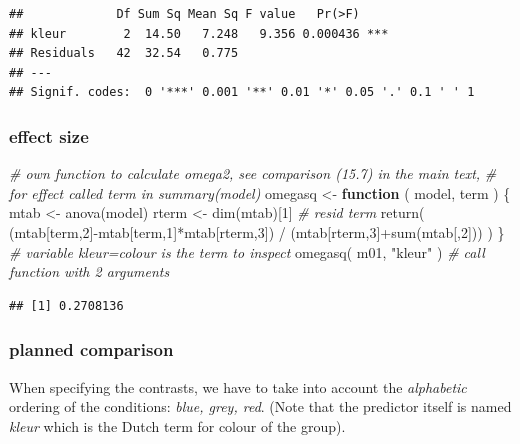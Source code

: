 \documentclass[
]{book}
\newenvironment{Shaded}{\begin{snugshade}}{\end{snugshade}}
\newcommand{\CommentTok}[1]{\textcolor[rgb]{0.56,0.35,0.01}{\textit{#1}}}
\newcommand{\ControlFlowTok}[1]{\textcolor[rgb]{0.13,0.29,0.53}{\textbf{#1}}}
\newcommand{\DecValTok}[1]{\textcolor[rgb]{0.00,0.00,0.81}{#1}}
\newcommand{\FunctionTok}[1]{\textcolor[rgb]{0.00,0.00,0.00}{#1}}
\newcommand{\NormalTok}[1]{#1}
\newcommand{\OtherTok}[1]{\textcolor[rgb]{0.56,0.35,0.01}{#1}}
\newcommand{\SpecialCharTok}[1]{\textcolor[rgb]{0.00,0.00,0.00}{#1}}
\newcommand{\StringTok}[1]{\textcolor[rgb]{0.31,0.60,0.02}{#1}}
\begin{document}
\begin{verbatim}
##             Df Sum Sq Mean Sq F value   Pr(>F)    
## kleur        2  14.50   7.248   9.356 0.000436 ***
## Residuals   42  32.54   0.775                     
## ---
## Signif. codes:  0 '***' 0.001 '**' 0.01 '*' 0.05 '.' 0.1 ' ' 1
\end{verbatim}

\hypertarget{R:omega-square}{%
\subsubsection{effect size}\label{R:omega-square}}

\begin{Shaded}
\begin{Highlighting}[]
\CommentTok{\# own function to calculate omega2, see comparison (15.7) in the main text,}
\CommentTok{\# for effect called \textasciigrave{}term\textasciigrave{} in summary(\textasciigrave{}model\textasciigrave{})}
\NormalTok{omegasq }\OtherTok{\textless{}{-}} \ControlFlowTok{function}\NormalTok{ ( model, term ) \{   }
\NormalTok{     mtab }\OtherTok{\textless{}{-}} \FunctionTok{anova}\NormalTok{(model)}
\NormalTok{     rterm }\OtherTok{\textless{}{-}} \FunctionTok{dim}\NormalTok{(mtab)[}\DecValTok{1}\NormalTok{] }\CommentTok{\# resid term}
     \FunctionTok{return}\NormalTok{( (mtab[term,}\DecValTok{2}\NormalTok{]}\SpecialCharTok{{-}}\NormalTok{mtab[term,}\DecValTok{1}\NormalTok{]}\SpecialCharTok{*}\NormalTok{mtab[rterm,}\DecValTok{3}\NormalTok{]) }\SpecialCharTok{/} 
\NormalTok{             (mtab[rterm,}\DecValTok{3}\NormalTok{]}\SpecialCharTok{+}\FunctionTok{sum}\NormalTok{(mtab[,}\DecValTok{2}\NormalTok{])) )}
\NormalTok{\}}
\CommentTok{\# variable kleur=colour is the term to inspect}
\FunctionTok{omegasq}\NormalTok{( m01, }\StringTok{"kleur"}\NormalTok{ ) }\CommentTok{\# call function with 2 arguments}
\end{Highlighting}
\end{Shaded}

\begin{verbatim}
## [1] 0.2708136
\end{verbatim}

\hypertarget{planned-comparison-2}{%
\subsubsection{planned comparison}\label{planned-comparison-2}}

When specifying the contrasts, we have to take into account the
\emph{alphabetic} ordering of the conditions: \emph{blue, grey, red}.
(Note that the predictor itself is named \emph{kleur} which is the Dutch term for colour of the group).
\end{document}
